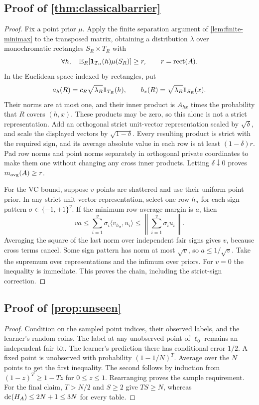 \subsection[Proof of result classicalbarrier]{Proof of \cref{thm:classicalbarrier}}\label{proof:classicalbarrier}
\begin{proof}
Fix a point prior $\mu$. Apply the finite separation argument of \cref{lem:finite-minimax} to the transposed matrix, obtaining a distribution $\lambda$ over monochromatic rectangles $S_R\times T_R$ with
\[
 \forall h,\quad\mathbb E_R[\mathbf 1_{T_R}(h)\mu(S_R)]\ge r,
 \qquad r=\operatorname{rect}(A).
\]
In the Euclidean space indexed by rectangles, put
\[
 a_h(R)=c_R\sqrt{\lambda_R}\mathbf 1_{T_R}(h),\qquad
 b_x(R)=\sqrt{\lambda_R}\mathbf 1_{S_R}(x).
\]
Their norms are at most one, and their inner product is $A_{hx}$ times the probability that $R$ covers $(h,x)$. These products may be zero, so this alone is not a strict representation. Add an orthogonal strict unit-vector representation scaled by $\sqrt\delta$, and scale the displayed vectors by $\sqrt{1-\delta}$. Every resulting product is strict with the required sign, and its average absolute value in each row is at least $(1-\delta)r$. Pad row norms and point norms separately in orthogonal private coordinates to make them one without changing any cross inner products. Letting $\delta\downarrow0$ proves $m_{\rm avg}(A)\ge r$.

For the VC bound, suppose $v$ points are shattered and use their uniform point prior. In any strict unit-vector representation, select one row $h_\sigma$ for each sign pattern $\sigma\in\{-1,+1\}^v$. If the minimum row-average margin is $a$, then
\[
 va\le\sum_{i=1}^v\sigma_i\langle v_{h_\sigma},u_i\rangle
 \le\left\|\sum_{i=1}^v\sigma_i u_i\right\|.
\]
Averaging the square of the last norm over independent fair signs gives $v$, because cross terms cancel. Some sign pattern has norm at most $\sqrt v$, so $a\le1/\sqrt v$. Take the supremum over representations and the infimum over priors. For $v=0$ the inequality is immediate. This proves the chain, including the strict-sign correction.
\end{proof}
\subsection[Proof of result unseen]{Proof of \cref{prop:unseen}}\label{proof:unseen}
\begin{proof}
Condition on the sampled point indices, their observed labels, and the learner's random coins. The label at any unobserved point of $\ell_0$ remains an independent fair bit. The learner's prediction there has conditional error $1/2$. A fixed point is unobserved with probability $(1-1/N)^T$. Average over the $N$ points to get the first inequality. The second follows by induction from $(1-z)^T\ge1-Tz$ for $0\le z\le1$. Rearranging proves the sample requirement. For the final claim, $T>N/2$ and $S\ge2$ give $TS\ge N$, whereas $\operatorname{dc}(H_A)\le2N+1\le3N$ for every table.
\end{proof}
